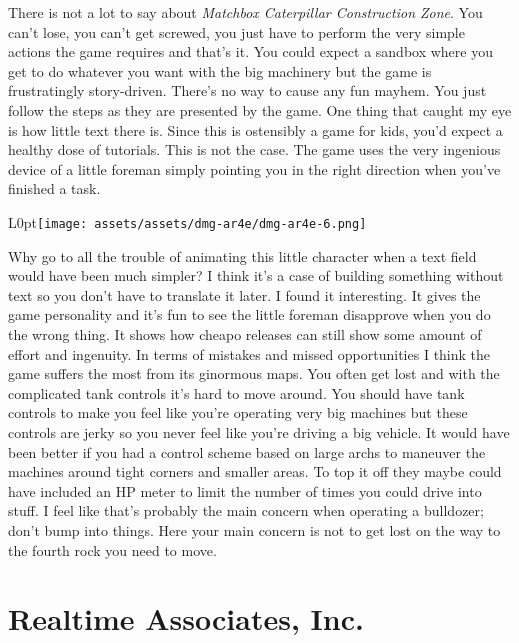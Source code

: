 \documentclass{book}
\begin{document}
There is not a lot to say about \emph{Matchbox Caterpillar Construction Zone}. You can’t lose, you can’t get screwed, you just have to perform the very simple actions the game requires and that’s it. You could expect a sandbox where you get to do whatever you want with the big machinery but the game is frustratingly story-driven. There’s no way to cause any fun mayhem. You just follow the steps as they are presented by the game. One thing that caught my eye is how little text there is. Since this is ostensibly a game for kids, you’d expect a healthy dose of tutorials. This is not the case. The game uses the very ingenious device of a little foreman simply pointing you in the right direction when you’ve finished a task.\par
\begin{wrapfigure}{L}{0pt}{\texttt{[image: assets/assets/dmg-ar4e/dmg-ar4e-6.png]}}\end{wrapfigure}\noindent
Why go to all the trouble of animating this little character when a text field would have been much simpler? I think it’s a case of building something without text so you don’t have to translate it later. I found it interesting. It gives the game personality and it’s fun to see the little foreman disapprove when you do the wrong thing. It shows how cheapo releases can still show some amount of effort and ingenuity. In terms of mistakes and missed opportunities I think the game suffers the most from its ginormous maps. You often get lost and with the complicated tank controls it’s hard to move around. You should have tank controls to make you feel like you’re operating very big machines but these controls are jerky so you never feel like you’re driving a big vehicle. It would have been better if you had a control scheme based on large archs to maneuver the machines around tight corners and smaller areas. To top it off they maybe could have included an HP meter to limit the number of times you could drive into stuff. I feel like that’s probably the main concern when operating a bulldozer; don’t bump into things. Here your main concern is not to get lost on the way to the fourth rock you need to move.\par
\FloatBarrier\section*{Realtime Associates, Inc.}
\FloatBarrier\vspace{\baselineskip}\begin{figure}[H]\end{figure}
\end{document}
